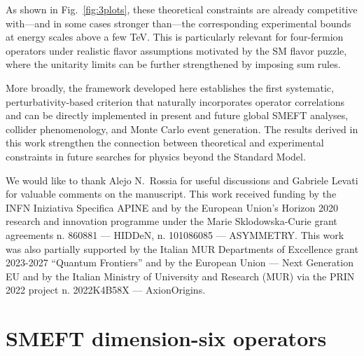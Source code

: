 \documentclass[
aps,
prd,
10pt,
twocolumn,
oneside,
preprintnumbers,
superscriptaddress,
amsmath,
amssymb,
nofootinbib,
flushbottom]{revtex4-2}
\begin{document}
As shown in Fig.~\ref{fig:3plots}, these theoretical constraints are already competitive with---and in some cases stronger than---the corresponding experimental bounds at energy scales above a few TeV. 
This is particularly relevant for four-fermion operators under realistic flavor assumptions motivated by the SM flavor puzzle, where the unitarity limits can be further strengthened by imposing sum rules.

More broadly, the framework developed here establishes the first
systematic, perturbativity-based criterion that naturally incorporates
operator correlations and can be directly implemented in present and
future global SMEFT analyses, collider phenomenology, and Monte Carlo
event generation.
The results derived in this work strengthen the connection between theoretical and experimental constraints in future searches for physics beyond the Standard Model.

\begin{acknowledgments}
We would like to thank Alejo N.~Rossia for useful discussions and Gabriele Levati for valuable comments on the manuscript.
This work received funding by the INFN Iniziativa Specifica APINE and by the European Union's Horizon 2020 research and innovation programme under the Marie Sklodowska-Curie grant agreements n. 860881 --- HIDDeN, n. 101086085 --- ASYMMETRY. This work was also partially supported by the Italian MUR Departments of Excellence grant 2023-2027 ``Quantum Frontiers'' and by the European Union --- Next Generation EU and by the Italian Ministry of University and Research (MUR) via the PRIN 2022 project n. 2022K4B58X --- AxionOrigins. 
\end{acknowledgments}


\appendix

\section{SMEFT dimension-six operators\label{app:ops}}
\end{document}

